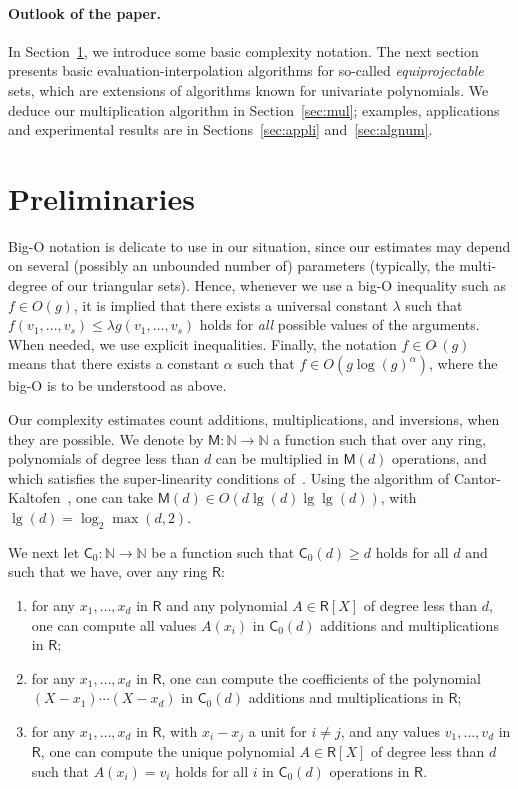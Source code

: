 \documentclass[amsthm]{elsart}
\def\C {\ensuremath{\mathsf{C}}}
\def\N {\ensuremath{\mathbb{N}}}
\def\M {\ensuremath{\mathsf{M}}}
\def\rng {\ensuremath{\mathsf{R}}}
\theoremstyle{plain}
\begin{document}
\paragraph*{Outlook of the paper.} In Section~\ref{sec:prel}, we
introduce some basic complexity notation. The next section presents
basic evaluation-interpolation algorithms for so-called {\em
  equiprojectable} sets, which are extensions of algorithms known for
univariate polynomials. We deduce our multiplication algorithm in
Section~\ref{sec:mul}; examples, applications and experimental results
are in Sections~\ref{sec:appli} and~\ref{sec:algnum}.




\section{Preliminaries}\label{sec:prel}

Big-O notation is delicate to use in our situation, since our
estimates may depend on several (possibly an unbounded number of)
parameters (typically, the multi-degree of our triangular
sets). Hence, whenever we use a big-O inequality such as $f \in O(g)$,
it is implied that there exists a universal constant $\lambda$ such
that $f(v_1,\dots,v_s) \le \lambda g(v_1,\dots,v_s)$ holds for {\em
  all} possible values of the arguments. When needed, we use explicit
inequalities. Finally, the notation $f \in O\tilde{~}(g)$ means that
there exists a constant $\alpha$ such that $f \in O(g
\log(g)^\alpha)$, where the big-O is to be understood as above.

Our complexity estimates count additions, multiplications, and
inversions, when they are possible. We denote by $\M:\N \to\N$ a
function such that over any ring, polynomials of degree less than $d$
can be multiplied in $\M(d)$ operations, and which
satisfies the super-linearity conditions of~\cite[Chapter
8]{GaGe99}. Using the algorithm of Cantor-Kaltofen~\cite{CaKa91}, one
can take $\M(d) \in O(d \lg(d)\lg\lg(d))$, with $\lg(d)=\log_2
\max(d,2)$.

We next let $\C_0:\N \to \N$ be a function such that $\C_0(d) \ge d$
holds for all $d$ and such that we have, over any ring $\rng$:
\begin{enumerate}
\item for any $x_1,\dots,x_d$ in $\rng$ and any polynomial $A \in
  \rng[X]$ of degree less than $d$, one can compute all values
  $A(x_i)$ in $\C_0(d)$ additions and multiplications in $\rng$;

\smallskip

\item for any $x_1,\dots,x_d$ in $\rng$, one can compute the
  coefficients of the polynomial $(X-x_1)\cdots (X-x_d)$ in $\C_0(d)$
  additions and multiplications in $\rng$;

\smallskip

\item for any $x_1,\dots,x_d$ in $\rng$, with $x_i - x_j$ a unit for
  $i\ne j$, and any values $v_1,\dots,v_d$ in $\rng$, one can compute
  the unique polynomial $A \in \rng[X]$ of degree less than $d$ such
  that $A(x_i)=v_i$ holds for all $i$ in $\C_0(d)$ operations in
  $\rng$.
\end{enumerate}
\end{document}
